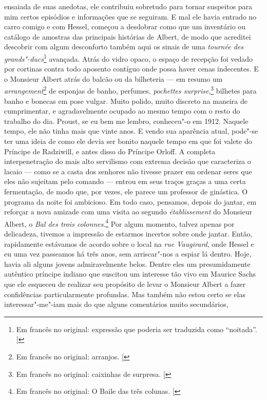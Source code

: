 ensaiada de suas anedotas, ele contribuiu sobretudo para tornar
suspeitos para mim certos episódios e informações que se seguiram. E mal
ele havia entrado no carro comigo e com Hessel, começou a desdobrar como
que um inventário ou catálogo de amostras das principais histórias de
Albert, de modo que acreditei descobrir com algum desconforto também
aqui os sinais de uma \emph{tournée des grands"-ducs}\footnote{Em francês no original: expressão que poderia ser traduzida como ``noitada''. {[}\versal{N.~T.}{]}} avançada. Atrás do
vidro opaco, o espaço de recepção foi vedado por cortinas contra todo
aposento contíguo onde possa haver cenas indecentes. E o Monsieur Albert
atrás do balcão ou da bilheteria --- em resumo um \emph{arrangement}\footnote{Em francês no original: arranjos. {[}\versal{N.~T.}{]}} de
esponjas de banho, perfumes, \emph{pochettes surprise},\footnote{Em francês no original: caixinhas de surpresa. {[}\versal{N.~T.}{]}} bilhetes para
banho e bonecas em pose vulgar. Muito polido, muito discreto na maneira
de cumprimentar, e agradavelmente ocupado ao mesmo tempo com o resto do
trabalho do dia. Proust, se eu bem me lembro, conheceu"-o em 1912.
Naquele tempo, ele não tinha mais que vinte anos. E vendo sua aparência
atual, pode"-se ter uma ideia de como ele devia ser bonito naquele tempo
em que foi valete do Príncipe de Radziwill, e antes disso do Príncipe
Orloff. A completa interpenetração do mais alto servilismo com extrema
decisão que caracteriza o lacaio --- como se a casta dos senhores não
tivesse prazer em ordenar seres que eles não sujeitam pelo comando ---
entrou em seus traços graças a uma certa fermentação, de modo que, por
vezes, ele parece um professor de ginástica. O programa da noite foi
ambicioso. Em todo caso, pensamos, depois do jantar, em reforçar a nova
amizade com uma visita ao segundo \emph{établissement} do Monsieur
Albert, o \emph{Bal des trois colonnes}.\footnote{Em francês no original: O Baile das três colunas. {[}\versal{N.~T.}{]}} Por algum momento, talvez
apenas por delicadeza, tivemos a impressão de estarmos incertos sobre
onde jantar. Então, rapidamente estávamos de acordo sobre o local na
\emph{rue Vaugirard}, onde Hessel e eu uma vez passeamos há três anos,
sem arriscar"-nos a espiar lá dentro. Hoje, havia ali alguns jovens
admiravelmente belos. Dentre eles um presumidamente autêntico príncipe
indiano que suscitou um interesse tão vivo em Maurice Sachs que ele
esqueceu de realizar seu propósito de levar o Monsieur Albert a fazer
confidências particularmente profundas. Mas também não estou certo se
elas interessar"-me"-iam mais do que alguns comentários muito secundários,
